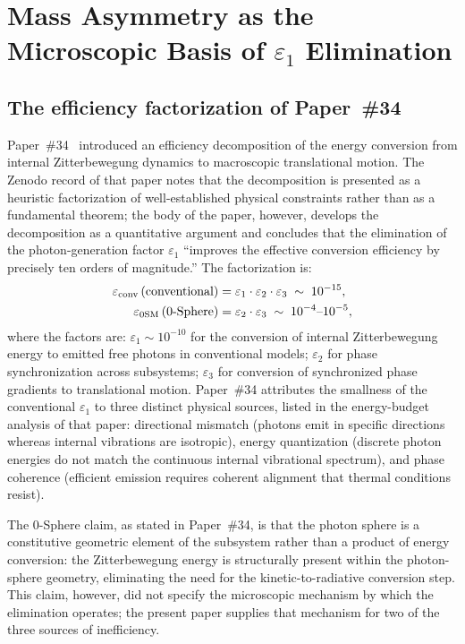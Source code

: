 \documentclass[%
 reprint, amsmath,amssymb, aps, prb, ]{revtex4-2}
\numberwithin{equation}{section}
\begin{document}
\section{\texorpdfstring{Mass Asymmetry as the Microscopic Basis of $\varepsilon_1$ Elimination}{Mass Asymmetry as the Microscopic Basis of epsilon 1 Elimination}}
\label{sec:mass_asymmetry}

\subsection{The efficiency factorization of Paper~\#34}

Paper~\#34~\cite{hanamura34} introduced an efficiency decomposition of the energy conversion from internal Zitterbewegung dynamics to macroscopic translational motion. The Zenodo record of that paper notes that the decomposition is presented as a heuristic factorization of well-established physical constraints rather than as a fundamental theorem; the body of the paper, however, develops the decomposition as a quantitative argument and concludes that the elimination of the photon-generation factor $\varepsilon_1$ ``improves the effective conversion efficiency by precisely ten orders of magnitude.'' The factorization is:
\begin{align}
\varepsilon_{\rm conv}\,(\text{conventional})
&= \varepsilon_1 \cdot \varepsilon_2 \cdot \varepsilon_3 \;\sim\; 10^{-15},
\label{eq:eps_conv}\\
\varepsilon_{\rm 0SM}\,(\text{0-Sphere})
&= \varepsilon_2 \cdot \varepsilon_3 \;\sim\; 10^{-4}\text{--}10^{-5},
\label{eq:eps_0sm}
\end{align}
where the factors are: $\varepsilon_1 \sim 10^{-10}$ for the conversion of internal Zitterbewegung energy to emitted free photons in conventional models; $\varepsilon_2$ for phase synchronization across subsystems; $\varepsilon_3$ for conversion of synchronized phase gradients to translational motion. Paper~\#34 attributes the smallness of the conventional $\varepsilon_1$ to three distinct physical sources, listed in the energy-budget analysis of that paper: directional mismatch (photons emit in specific directions whereas internal vibrations are isotropic), energy quantization (discrete photon energies do not match the continuous internal vibrational spectrum), and phase coherence (efficient emission requires coherent alignment that thermal conditions resist).

The 0-Sphere claim, as stated in Paper~\#34, is that the photon sphere is a constitutive geometric element of the subsystem rather than a product of energy conversion: the Zitterbewegung energy is structurally present within the photon-sphere geometry, eliminating the need for the kinetic-to-radiative conversion step. This claim, however, did not specify the microscopic mechanism by which the elimination operates; the present paper supplies that mechanism for two of the three sources of inefficiency.
\end{document}
